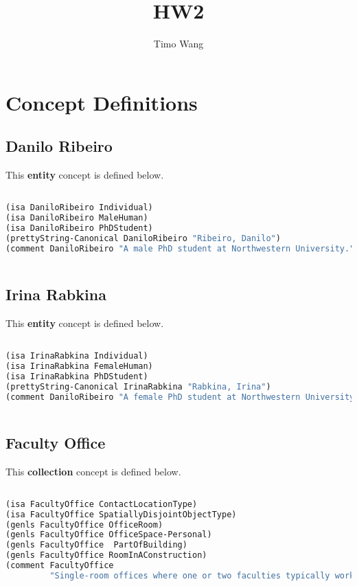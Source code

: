 \documentclass[11pt]{article}
\title{HW2}
\author{Timo Wang}
\begin{document}
\maketitle

\section{Concept Definitions}
\subsection{Danilo Ribeiro}
This \textbf{entity} concept is defined below. 
\begin{lstlisting}[language=lisp]

(isa DaniloRibeiro Individual)
(isa DaniloRibeiro MaleHuman)
(isa DaniloRibeiro PhDStudent)
(prettyString-Canonical DaniloRibeiro "Ribeiro, Danilo")
(comment DaniloRibeiro "A male PhD student at Northwestern University.")
  
\end{lstlisting}

\subsection{Irina Rabkina}
This \textbf{entity} concept is defined below. 
\begin{lstlisting}[language=lisp]

(isa IrinaRabkina Individual)
(isa IrinaRabkina FemaleHuman)
(isa IrinaRabkina PhDStudent)
(prettyString-Canonical IrinaRabkina "Rabkina, Irina")
(comment DaniloRibeiro "A female PhD student at Northwestern University.")
  
\end{lstlisting}

\subsection{Faculty Office}
This \textbf{collection} concept is defined below.
\begin{lstlisting}[language=lisp]

(isa FacultyOffice ContactLocationType)
(isa FacultyOffice SpatiallyDisjointObjectType)
(genls FacultyOffice OfficeRoom)
(genls FacultyOffice OfficeSpace-Personal)
(genls FacultyOffice  PartOfBuilding)
(genls FacultyOffice RoomInAConstruction)
(comment FacultyOffice 
         "Single-room offices where one or two faculties typically work.")

\end{lstlisting}
\end{document}
